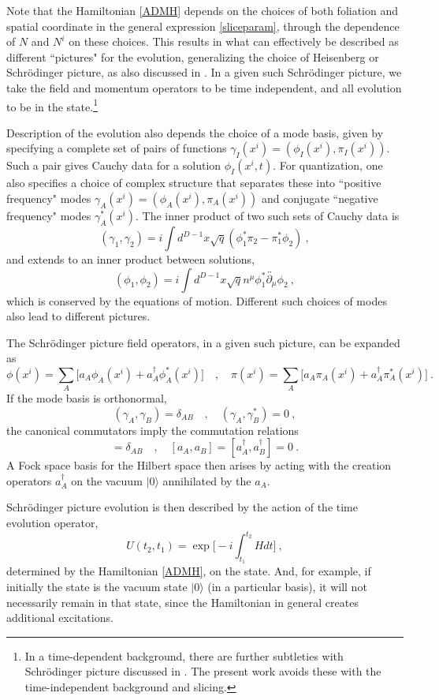 \documentclass[12pt]{article}
\numberwithin{equation}{section}
\newcommand{\beq}{\begin{equation}}
\newcommand{\eeq}{\end{equation}}
\begin{document}
Note that the Hamiltonian \eqref{ADMH} depends on the choices of both foliation and spatial coordinate in the general expression
\eqref{sliceparam}, through the dependence of $N$ and $N^i$ on these choices.  This results in what can effectively be described as different ``pictures" for the evolution, generalizing the choice of Heisenberg or Schr\"odinger picture, as also discussed in \cite{SE2d}.  In a given such Schr\"odinger picture, we take the field and momentum operators to be time independent, and all evolution to be in the state.\footnote{In a time-dependent background, there are further subtleties with Schr\"odinger picture discussed in \cite{ToVa,CMOV,CFMM,AgAs,MuOe}. The present work avoids these with the time-independent background and slicing.}  

Description of the evolution also depends the choice of a mode basis, given by specifying a complete set of pairs of functions $\gamma_I(x^i)=(\phi_I(x^i),\pi_I(x^i))$.  Such a pair gives Cauchy data for a solution $\phi_I(x^i,t)$.  For quantization, one also specifies  a choice of complex structure 
\cite{More,Kay,AgAs} that separates these into ``positive frequency" modes $\gamma_A(x^i)=(\phi_A(x^i),\pi_A(x^i))$ and conjugate ``negative frequency" modes $\gamma_A^*(x^i)$.  
The inner product of two such sets of Cauchy data is 
\beq
(\gamma_1, \gamma_2)= i\int d^{D-1}x \sqrt{q}(\phi_1^*\pi_2-\pi_1^*\phi_2)\ ,
\eeq
and extends to an inner product between solutions,  
\beq\label{InnerProduct}
(\phi_1,\phi_2) = i \int d^{D-1} x \sqrt{q} n^\mu \phi_1^*\overleftrightarrow{\partial_\mu} \phi_2\ ,
\eeq
which is conserved by the equations of motion.  Different such choices of modes also lead to different pictures.

The Schr\"odinger picture field operators, in a given such picture, can be expanded as
\beq\label{opexps}
\phi(x^i) = \sum_A \big[a_A \phi_A(x^i)+a_A^{\dagger} \phi_A^*(x^i)\big]\quad ,\quad \pi(x^i) = \sum_A \big[a_A\pi_A(x^i)+a_A^{\dagger} \pi_A^*(x^i)\big]\ .
\eeq
If the mode basis is orthonormal,
\beq
(\gamma_A,\gamma_B) = \delta_{AB}\quad , \quad (\gamma_A,\gamma_B^*) = 0\ ,
\eeq 
the canonical commutators imply the commutation relations
\beq
[a_A, a_B^{\dagger}] = \delta_{AB}\quad ,\quad  [a_A, a_B]=[a_A^{\dagger}, a_B^{\dagger}] = 0\ .
\eeq
A Fock space basis for the Hilbert space then arises by acting with the creation operators $a_A^\dagger$ on the vacuum $|0\rangle$ annihilated by the $a_A$.  

Schr\"odinger picture evolution is then described by the action of the time evolution operator,
\beq
U(t_2, t_1)= \exp{\bigg[-i\int_{t_1}^{t_2} H dt\bigg]}\ ,
\eeq
determined by the Hamiltonian \eqref{ADMH}, on the state.  And, for example, if initially the state is the vacuum state $|0\rangle$ (in a particular basis), it will not necessarily remain in that state, since the Hamiltonian in general creates additional excitations.
\end{document}
